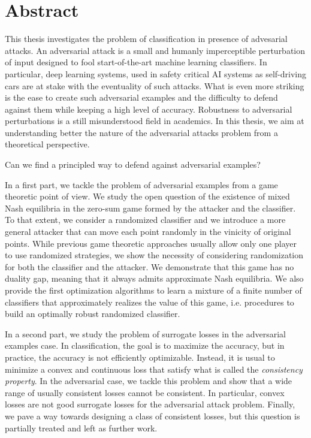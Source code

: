 \chapter*{Abstract}
This thesis investigates the problem of classification in presence of advesarial attacks. An adversarial attack is a small and humanly imperceptible perturbation of input designed to fool start-of-the-art machine learning classifiers. In particular, deep learning systems, used in safety critical AI systems as self-driving cars are at stake with the eventuality of such attacks. What is even more striking is the ease to create such adversarial examples and the difficulty to defend against them while keeping a high level of accuracy. Robustness to adversarial perturbations is a still misunderstood field in academics. In this thesis, we aim at understanding better the nature of the adversarial attacks problem from a theoretical perspective.

\begin{center}
    Can we find a principled way to defend against adversarial examples?
\end{center}


In a first part, we tackle the problem of adversarial examples from a game theoretic point of view. We
study the open question of the existence of mixed
Nash equilibria in the zero-sum game formed by
the attacker and the classifier. To that extent, we consider a randomized classifier and we introduce a more general attacker that can move each point randomly in the vinicity of original points. While previous
game theoretic approaches usually allow only one player to use randomized strategies, we show the necessity of considering randomization for both the classifier and
the attacker. We demonstrate that this game has
no duality gap, meaning that it always admits approximate Nash equilibria. We also provide the
first optimization algorithms to learn a mixture of
a finite number of classifiers that approximately
realizes the value of this game, i.e. procedures to
build an optimally robust randomized classifier.





In a second part, we study the problem of surrogate losses in the adversarial examples case. In classification, the goal is to maximize the accuracy, but in practice, the accuracy is not efficiently optimizable. Instead, it is usual to minimize a convex and continuous loss that satisfy what is called the \emph{consistency property}. In the adversarial case, we tackle this problem and show that a wide range of usually consistent losses cannot be consistent. In particular, convex losses are not good  surrogate losses for the adversarial attack problem.  Finally, we pave a way towards designing a class of consistent losses, but this question is partially treated and left as further work.

